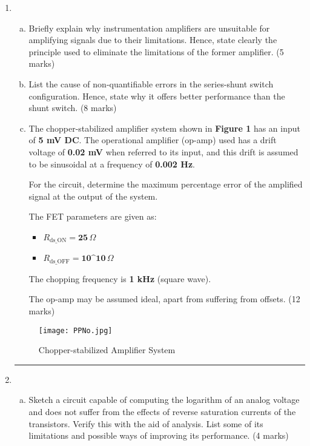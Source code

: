 \documentclass[a4paper,9pt,twoside,openany,twocolumn]{memoir}
\begin{document}
\begin{enumerate}
\item 
    \begin{enumerate}[(a)]
        \item Briefly explain why instrumentation amplifiers are unsuitable for amplifying signals due to their limitations. Hence, state clearly the principle used to eliminate the limitations of the former amplifier. \hfill{(5 marks)}
        
        \item List the cause of non-quantifiable errors in the series-shunt switch configuration. Hence, state why it offers better performance than the shunt switch. \hfill{(8 marks)}
        
        \item The chopper-stabilized amplifier system shown in \textbf{Figure 1} has an input of \textbf{5 mV DC}. The operational amplifier (op-amp) used has a drift voltage of \textbf{0.02 mV} when referred to its input, and this drift is assumed to be sinusoidal at a frequency of \textbf{0.002 Hz}.

For the circuit, determine the maximum percentage error of the amplified signal at the output of the system.

The FET parameters are given as:
\begin{itemize}
    \item \( R_{\text{ds\_ON}} = \textbf{25} \, \Omega \)
    \item \( R_{\text{ds\_OFF}} = \textbf{10^{10}} \, \Omega \)
\end{itemize}

The chopping frequency is \textbf{1 kHz} (square wave).

The op-amp may be assumed ideal, apart from suffering from offsets. \hfill{(12 marks)}
    \end{enumerate}

\begin{figure}[h!]
    \centering
    \texttt{[image: PPNo.jpg]}
    \caption{Chopper-stabilized Amplifier System}
\end{figure}

\begin{center}\rule{0.5\linewidth}{0.5pt}\end{center}

\item 
    \begin{enumerate}[(a)]
        \item Sketch a circuit capable of computing the logarithm of an analog voltage and does not suffer from the effects of reverse saturation currents of the transistors. Verify this with the aid of analysis. List some of its limitations and possible ways of improving its performance. \hfill{(4 marks)}


\end{enumerate}
\end{enumerate}
\end{document}
